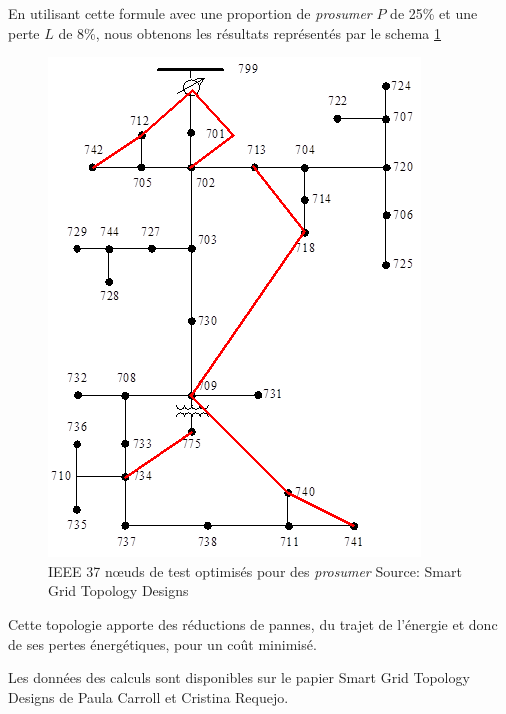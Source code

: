 En utilisant cette formule avec une proportion de \textit{prosumer} $P$ de 25\% et une perte $L$ de 8\%,
nous obtenons les résultats représentés par le schema \ref{fig:ieee_radial_tree_optimized}

\begin{figure}
  \includegraphics[scale=0.5]{media/ieee_radial_tree_optimized.png}
  \caption{
      IEEE 37 nœuds de test optimisés pour des \textit{prosumer}\newline
      \tiny{Source:\newline
        Smart Grid Topology Designs
      }
  }
  \label{fig:ieee_radial_tree_optimized}
\end{figure}

Cette topologie apporte des réductions de pannes, du trajet de l'énergie et donc de ses pertes énergétiques, pour un coût
minimisé.

Les données des calculs sont disponibles sur le papier Smart Grid Topology Designs de Paula Carroll et Cristina Requejo.